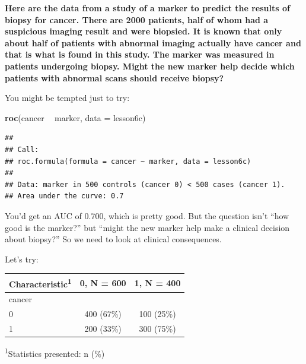 \documentclass[]{book}
\newenvironment{Shaded}{\begin{snugshade}}{\end{snugshade}}
\newcommand{\CommentTok}[1]{\textcolor[rgb]{0.56,0.35,0.01}{\textit{#1}}}
\newcommand{\DataTypeTok}[1]{\textcolor[rgb]{0.13,0.29,0.53}{#1}}
\newcommand{\KeywordTok}[1]{\textcolor[rgb]{0.13,0.29,0.53}{\textbf{#1}}}
\newcommand{\NormalTok}[1]{#1}
\newcommand{\OperatorTok}[1]{\textcolor[rgb]{0.81,0.36,0.00}{\textbf{#1}}}
\newcommand{\StringTok}[1]{\textcolor[rgb]{0.31,0.60,0.02}{#1}}
\begin{document}
\textbf{Here are the data from a study of a marker to predict the
results of biopsy for cancer. There are 2000 patients, half of whom had
a suspicious imaging result and were biopsied. It is known that only
about half of patients with abnormal imaging actually have cancer and
that is what is found in this study. The marker was measured in patients
undergoing biopsy. Might the new marker help decide which patients with
abnormal scans should receive biopsy?}

You might be tempted just to try:

\begin{Shaded}
\begin{Highlighting}[]
\KeywordTok{roc}\NormalTok{(cancer }\OperatorTok{~}\StringTok{ }\NormalTok{marker, }\DataTypeTok{data =}\NormalTok{ lesson6c)}
\end{Highlighting}
\end{Shaded}

\begin{verbatim}
## 
## Call:
## roc.formula(formula = cancer ~ marker, data = lesson6c)
## 
## Data: marker in 500 controls (cancer 0) < 500 cases (cancer 1).
## Area under the curve: 0.7
\end{verbatim}

You'd get an AUC of 0.700, which is pretty good. But the question isn't
``how good is the marker?'' but ``might the new marker help make a
clinical decision about biopsy?'' So we need to look at clinical
consequences.

Let's try:

\begin{Shaded}
\end{Shaded}

\captionsetup[table]{labelformat=empty,skip=1pt}
\begin{longtable}{lcc}
\toprule
\textbf{Characteristic}\textsuperscript{1} & \textbf{0}, N = 600 & \textbf{1}, N = 400 \\ 
\midrule
cancer &  &  \\ 
0 & 400 (67\%) & 100 (25\%) \\ 
1 & 200 (33\%) & 300 (75\%) \\ 
\bottomrule
\end{longtable}
\vspace{-5mm}
\begin{minipage}{\linewidth}
\textsuperscript{1}Statistics presented: n (\%) \\ 
\end{minipage}
\end{document}
